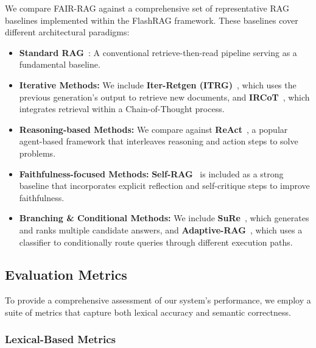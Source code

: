 \documentclass[11pt]{article}
\begin{document}
We compare FAIR-RAG against a comprehensive set of representative RAG baselines implemented within the FlashRAG framework. These baselines cover different architectural paradigms:

\begin{itemize}
    \item \textbf{Standard RAG}~\cite{lewis2020retrieval}: A conventional retrieve-then-read pipeline serving as a fundamental baseline.
    
    \item \textbf{Iterative Methods:} We include \textbf{Iter-Retgen (ITRG)}~\cite{shao2023iter}, which uses the previous generation's output to retrieve new documents, and \textbf{IRCoT}~\cite{trivedi2023interleavingretrievalchainofthoughtreasoning}, which integrates retrieval within a Chain-of-Thought process.
    
    \item \textbf{Reasoning-based Methods:} We compare against \textbf{ReAct}~\cite{yao2022react}, a popular agent-based framework that interleaves reasoning and action steps to solve problems.
    
    \item \textbf{Faithfulness-focused Methods:} \textbf{Self-RAG}~\cite{asai2023self} is included as a strong baseline that incorporates explicit reflection and self-critique steps to improve faithfulness.
    
    \item \textbf{Branching \& Conditional Methods:} We include \textbf{SuRe}~\cite{kim2024suresummarizingretrievalsusing}, which generates and ranks multiple candidate answers, and \textbf{Adaptive-RAG}~\cite{jeong2024adaptiveraglearningadaptretrievalaugmented}, which uses a classifier to conditionally route queries through different execution paths.
\end{itemize}

\subsection{Evaluation Metrics}

To provide a comprehensive assessment of our system's performance, we employ a suite of metrics that capture both lexical accuracy and semantic correctness.

\subsubsection{Lexical-Based Metrics}
\end{document}
